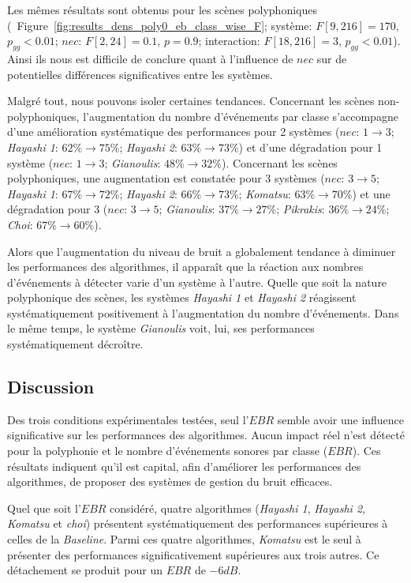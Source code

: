 Les mêmes résultats sont obtenus pour les scènes polyphoniques (\cf~Figure~\ref{fig:results_dens_poly0_eb_class_wise_F}; système: $F[9,216]=170$, $p_{gg}<0.01$; $nec$: $F[2,24]=0.1$, $p=0.9$; interaction: $F[18,216]=3$, $p_{gg}<0.01$). Ainsi ils nous est difficile de conclure quant à l'influence de $nec$ sur de potentielles différences significatives entre les systèmes.

Malgré tout, nous pouvons isoler certaines tendances. Concernant les scènes non-polyphoniques, l'augmentation du nombre d'événements par classe s'accompagne d'une amélioration systématique des performances pour 2 systèmes ($nec$: $1\rightarrow 3$; \emph{Hayashi 1}: $62\%\rightarrow 75\%$; \emph{Hayashi 2}: $63\%\rightarrow 73\%$) et d'une dégradation pour 1 système ($nec$: $1\rightarrow 3$; \emph{Gianoulis}: $48\%\rightarrow 32\%$). Concernant les scènes polyphoniques, une augmentation est constatée pour 3 systèmes ($nec$: $3\rightarrow 5$; \emph{Hayashi 1}: $67\%\rightarrow 72\%$; \emph{Hayashi 2}: $66\%\rightarrow 73\%$; \emph{Komatsu}: $63\%\rightarrow 70\%$) et une dégradation pour 3 ($nec$: $3\rightarrow 5$; \emph{Gianoulis}: $37\%\rightarrow 27\%$; \emph{Pikrakis}: $36\%\rightarrow 24\%$; \emph{Choi}: $67\%\rightarrow 60\%$).

Alors que l'augmentation du niveau de bruit a globalement tendance à diminuer les performances des algorithmes, il apparaît que la réaction aux nombres d'événements à détecter varie d'un système à l'autre. Quelle que soit la nature polyphonique des scènes, les systèmes \emph{Hayashi 1} et \emph{Hayashi 2} réagissent systématiquement positivement à l'augmentation du nombre d'événements. Dans le même temps, le système \emph{Gianoulis} voit, lui, ses performances systématiquement décroître.

\subsection{Discussion}

Des trois conditions expérimentales testées, seul l'$EBR$ semble avoir une influence significative sur les performances des algorithmes. Aucun impact réel n'est détecté pour la polyphonie et le nombre d'événements sonores par classe ($EBR$). Ces résultats indiquent qu'il est capital, afin d'améliorer les performances des algorithmes, de proposer des systèmes de gestion du bruit efficaces.

Quel que soit l'$EBR$ considéré, quatre algorithmes (\emph{Hayashi 1}, \emph{Hayashi 2}, \emph{Komatsu} et \emph{choi}) présentent systématiquement des performances supérieures à celles de la \emph{Baseline}. Parmi ces quatre algorithmes, \emph{Komatsu} est le seul à présenter des performances significativement supérieures aux trois autres. Ce détachement se produit pour un $EBR$ de $-6dB$.

